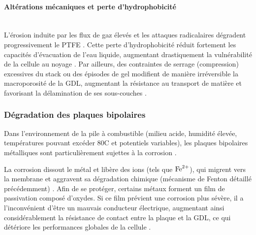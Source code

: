 \paragraph{Altérations mécaniques et perte d'hydrophobicité}\mbox{}\\
L'érosion induite par les flux de gaz élevés et les attaques radicalaires dégradent progressivement le PTFE \cite{park_review_2015}. Cette perte d'hydrophobicité réduit fortement les capacités d'évacuation de l'eau liquide, augmentant drastiquement la vulnérabilité de la cellule au noyage \cite{pan_gas_2021}. Par ailleurs, des contraintes de serrage (compression) excessives du stack ou des épisodes de gel modifient de manière irréversible la macroporosité de la GDL, augmentant la résistance au transport de matière et favorisant la délamination de ses sous-couches \cite{millichamp_mechanisms_2015}.

\subsubsection{Dégradation des plaques bipolaires}

Dans l'environnement de la pile à combustible (milieu acide, humidité élevée, températures pouvant excéder 80\textdegree C et potentiels variables), les plaques bipolaires métalliques sont particulièrement sujettes à la corrosion \cite{tawfik_metal_2007}. 

La corrosion dissout le métal et libère des ions (tels que $\ce{Fe^{2+}}$), qui migrent vers la membrane et aggravent sa dégradation chimique (mécanisme de Fenton détaillé précédemment) \cite{wang_stainless_2003}. Afin de se protéger, certains métaux forment un film de passivation composé d'oxydes. Si ce film prévient une corrosion plus sévère, il a l'inconvénient d'être un mauvais conducteur électrique, augmentant ainsi considérablement la résistance de contact entre la plaque et la GDL, ce qui détériore les performances globales de la cellule \cite{tawfik_metal_2007}.


